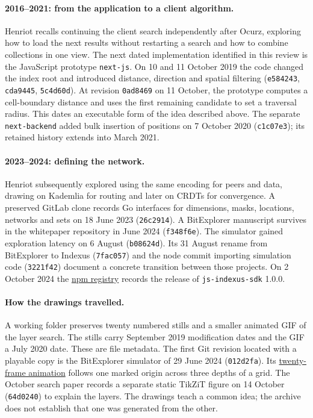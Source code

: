 \documentclass[11pt]{article}
\begin{document}
\paragraph{2016--2021: from the application to a client algorithm.}
Henriot recalls continuing the client search independently after Ocurz, exploring how to load the next results without restarting a search and how to combine collections in one view. The next dated implementation identified in this review is the JavaScript prototype \texttt{next-js}. On 10 and 11 October 2019 the code changed the index root and introduced distance, direction and spatial filtering (\texttt{e584243}, \texttt{cda9445}, \texttt{5c4d60d}). At revision \texttt{0ad8469} on 11 October, the prototype computes a cell-boundary distance and uses the first remaining candidate to set a traversal radius. This dates an executable form of the idea described above. The separate \texttt{next-backend} added bulk insertion of positions on 7 October 2020 (\texttt{c1c07e3}); its retained history extends into March 2021.

\paragraph{2023--2024: defining the network.}
Henriot subsequently explored using the same encoding for peers and data, drawing on Kademlia for routing and later on CRDTs for convergence. A preserved GitLab clone records Go interfaces for dimensions, masks, locations, networks and sets on 18 June 2023 (\texttt{26c2914}). A BitExplorer manuscript survives in the whitepaper repository in June 2024 (\texttt{f348f6e}). The simulator gained exploration latency on 6 August (\texttt{b08624d}). Its 31 August rename from BitExplorer to Indexus (\texttt{7fac057}) and the node commit importing simulation code (\texttt{3221f42}) document a concrete transition between those projects. On 2 October 2024 the \href{https://registry.npmjs.org/js-indexus-sdk/1.0.0}{npm registry} records the release of \texttt{js-indexus-sdk} 1.0.0.

\paragraph{How the drawings travelled.}
A working folder preserves twenty numbered stills and a smaller animated GIF of the layer search. The stills carry September 2019 modification dates and the GIF a July 2020 date. These are file metadata. The first Git revision located with a playable copy is the BitExplorer simulator of 29 June 2024 (\texttt{012d2fa}). Its \href{https://indexus.io/papers/animations/search-algorithm.gif}{twenty-frame animation} follows one marked origin across three depths of a grid. The October search paper records a separate static TikZiT figure on 14 October (\texttt{64d0240}) to explain the layers. The drawings teach a common idea; the archive does not establish that one was generated from the other.
\end{document}
